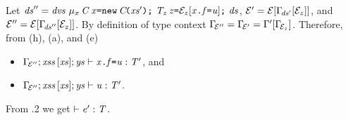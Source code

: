 Let $\decs''=\dvs\ \Dec{\Type{\mu_x}{\C}}{\x}{\ConstrCall{\C}{\xs'}}\ \Dec{\T_z}{\z}{\ctx_z[{\FieldAssign{\x}{\f}{{\valPrime}}}]}\ \decs$, ${\cal{E}'}={\cal{E}}[\Gamma_{\!\mathit{ds}'}[{\cal{E}}_z]]$, and ${\cal{E}}''={\cal{E}}[\Gamma_{\!\mathit{ds}''}[{\cal{E}}_z]]$. By definition of type context 
$\Gamma_{\!{\cal{E}}''}=\Gamma_{\!{\cal{E}}'}=\Gamma'[\Gamma_{\!{\cal{E}}_z}]$. Therefore, from (h), (a), and (e) 
\begin{itemize}
\item $\Gamma_{\!{\cal{E}}''};\mathit{xss}\,[\mathit{xs}];\mathit{ys}\vdash \mathit{x}\texttt{.}\mathit{f}\texttt{=}{\mathit{u}}:\mathit{T}'$, and 
\item $\Gamma_{\!{\cal{E}}''};\mathit{xss}\,[\mathit{xs}];\mathit{ys}\vdash {{\mathit{u}}}:\mathit{T}'$.
\end{itemize}
From .2 we get $\vdash \mathit{e}':\mathit{T}$.


